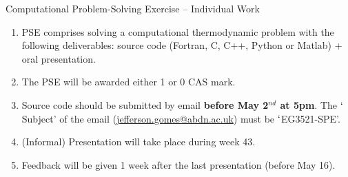 


\begin{center}
{\Large Computational Problem-Solving Exercise -- Individual Work}
\end{center}

\begin{enumerate}
%
\item PSE comprises solving a computational thermodynamic problem with the following deliverables: source code (Fortran, C, C++, Python or Matlab) + oral presentation. 
%
\item The PSE will be awarded either 1 or 0 CAS mark.
%
\item Source code should be submitted by email {\bf before May 2$^{nd}$ at 5pm}.  The $\lq$Subject' of the email (\href{mailto:jefferson.gomes@abdn.ac.uk}{jefferson.gomes@abdn.ac.uk}) must be $\lq$EG3521-SPE'.
%
\item (Informal) Presentation will take place during week 43.
%
\item Feedback will be given 1 week after the last presentation (before May 16).
\end{enumerate}
%



